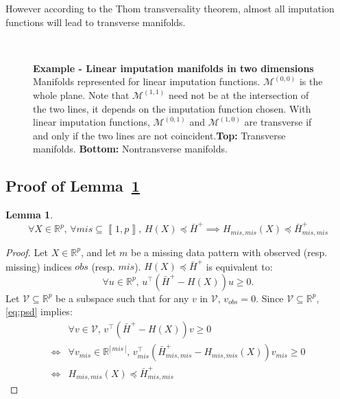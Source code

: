 \documentclass{article}
\newcommand{\RR}{\mathbb{R}}
\newcommand{\Mcal}{\mathcal{M}}
\newcommand{\Vcal}{\mathcal{V}}
\newcommand{\br}[1]{\left(#1\right)}
\newcommand{\bbr}[1]{\left\llbracket#1\right\rrbracket}
\newcommand{\abs}[1]{\left\vert\, #1 \,\right\vert}
\theoremstyle{plain}
\newtheorem{lemma}{Lemma}[section]
\begin{document}
However according to the Thom transversality theorem, almost all imputation functions will lead to transverse manifolds.

\begin{figure}[h]
    \begin{minipage}{.28\linewidth}
    \scalebox{.21}{}\\
    \scalebox{.21}{}
    \end{minipage}%
        \hfill%
    \begin{minipage}{.65\linewidth}
        \caption{\textbf{Example - Linear imputation manifolds in two dimensions} Manifolds represented for linear imputation functions. $\Mcal^{(0, 0)}$ is the whole plane. Note that $\Mcal^{(1, 1)}$ need not be at the intersection of the two lines, it depends on the imputation function chosen. With linear imputation functions, $\Mcal^{(0, 1)}$ and $\Mcal^{(1, 0)}$ are transverse if and only if the two lines are not coincident.\textbf{Top:} Transverse manifolds. \textbf{Bottom:} Nontransverse manifolds.}
         \label{fig:2d_linear_manifolds}
    \end{minipage}
\end{figure}


\subsection{Proof of Lemma~\ref{lem:lem1}}
\begin{lemma}
\label{lem:lem1}
\begin{equation*}
    \forall X \in \RR^p,\, \forall mis \subseteq \bbr{1, p},\, H(X) \preccurlyeq \bar{H}^+ \implies H_{mis, mis}(X) \preccurlyeq \bar{H}^+_{mis, mis}
\end{equation*}
\end{lemma}

\begin{proof}
Let $X \in \RR^p$, and let $m$ be a missing data pattern with observed (resp. missing) indices $obs$ (resp. $mis$).
$H(X) \preccurlyeq \bar{H}^+$ is equivalent to:
\begin{equation}
\label{eq:psd}
    \forall u \in \RR^p,\, u^\top \br{\bar{H}^+ - H(X)}u \geq 0.
\end{equation}
Let $\Vcal \subseteq \RR^p$ be a subspace such that for any $v$ in $\Vcal$, $v_{obs}=0$. Since $\Vcal \subseteq \RR^p$, \eqref{eq:psd} implies:
\begin{align*}
    & \forall v \in \Vcal, \, v^\top \br{\bar{H}^+ - H(X)} v \geq 0\\
    \iff & \forall v_{mis} \in \RR^{\abs{mis}}, \, v_{mis}^\top \br{\bar{H}_{mis, mis}^+ - H_{mis, mis}(X)} v_{mis} \geq 0\\
    \iff & H_{mis, mis}(X) \preccurlyeq \bar{H}_{mis, mis}^+
\end{align*}
\end{proof}
\end{document}
